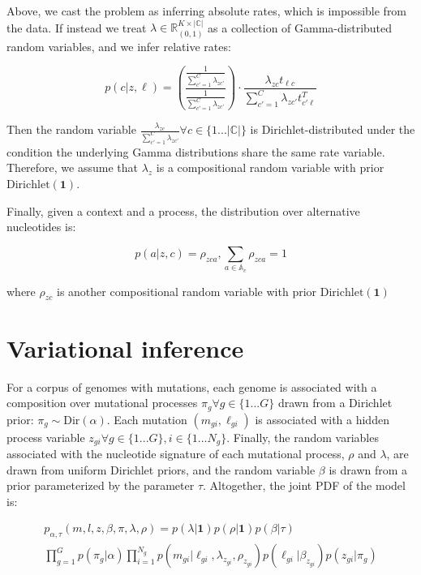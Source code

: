 \documentclass{article}
\begin{document}
Above, we cast the problem as inferring absolute rates, which is impossible from the data. If instead we treat $\lambda \in \mathbb{R}^{K \times |\mathbb{C}|}_{(0,1)}$ as a collection of Gamma-distributed random variables, and we infer relative rates:

\begin{equation}
p(c | z, \ell) = 
\left( \frac{\frac{1}{\sum_{c'=1}^{C} \lambda_{zc'}}}{\frac{1}{\sum_{c'=1}^{C} \lambda_{zc'}}} \right) \cdot \frac{\lambda_{zc}t_{\ell c}}{\sum_{c'=1}^{C} \lambda_{zc'}t^{T}_{c' \ell}} 
\end{equation}

Then the random variable $\frac{\lambda_{zc}}{\sum_{c'=1}^{C} \lambda_{zc'}} \forall c \in \{1 ... |\mathbb{C}|\}$ is Dirichlet-distributed under the condition the underlying Gamma distributions share the same rate variable. Therefore, we assume that $\lambda_z$ is a compositional random variable with prior $\mathrm{Dirichlet}(\mathbf{1})$.

Finally, given a context and a process, the distribution over alternative nucleotides is:

\begin{equation}
p(a | z, c) = \rho_{zca}, \sum_{a \in \mathbb{A}_c} \rho_{zca} = 1
\end{equation}

where $\rho_{zc}$ is another compositional random variable with prior $\mathrm{Dirichlet}(\mathbf{1})$

\section{Variational inference}

For a corpus of genomes with mutations, each genome is associated with a composition over mutational processes $\pi_g\forall g \in \{1...G\}$ drawn from a Dirichlet prior: $\pi_g \sim \mathrm{Dir}(\alpha)$. Each mutation $(m_{gi}, \ell_{gi})$ is associated with a hidden process variable $z_{gi} \forall g \in \{1...G\}, i \in \{1...N_g\}$. Finally, the random variables associated with the nucleotide signature of each mutational process, $\rho$ and $\lambda$, are drawn from uniform Dirichlet priors, and the random variable $\beta$ is drawn from a prior parameterized by the parameter $\tau$. Altogether, the joint PDF of the model is:

\begin{equation}
\begin{split}
p_{\alpha,\tau}(m,l,z,\beta,\pi,\lambda,\rho) = p(\lambda | \textbf{1})p(\rho | \textbf{1})p(\beta | \tau) \\
	 \prod_{g=1}^G p( \pi_g | \alpha ) \prod_{i=1}^{N_g} p(m_{gi} | \ell_{gi}, \lambda_{z_{gi}}, \rho_{z_{gi}} ) p( \ell_{gi} | \beta_{z_{gi}} ) p(z_{gi} | \pi_g )
\end{split}
\end{equation}
\end{document}

